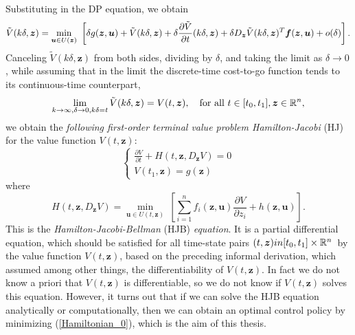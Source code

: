 Substituting in the DP equation, we obtain
\begin{equation}
\tilde{V}(k\delta,\bm{z})=\min_{\bm{u}\in U(\bm{z})}\ \left[\delta g(\bm{z},\bm{u})+\tilde{V}(k\delta,\bm{z})+\delta\frac{\partial\tilde{V}}{\partial t}(k\delta,\bm{z})\\
+\delta D_{\bm{z}}\tilde{V}(k\delta,\bm{z})^T\bm{f}(\bm{z},\bm{u})+o(\delta)\right].
\end{equation}
Canceling $\tilde{V}(k\delta,\bm{z})$ from both sides, dividing by $\delta$, and 
taking the limit as $\delta\to0$, while assuming that in the limit the discrete-time
 cost-to-go function tends to  its continuous-time counterpart,
\begin{equation*}
\lim_{k\to\infty,\delta\to0,k\delta=t}\tilde{V}(k\delta,\bm{z})=V(t,\bm{z}),\quad\text{for all}\ t\in[t_0,t_1],\bm{z}\in\mathbb{R}^n,
\end{equation*}
we obtain the \textit{following first-order terminal value problem Hamilton-Jacobi} (HJ) for the value function $V(t,\bm{z})$:
\begin{equation}
\begin{cases}
\frac{\partial V}{\partial t}+H(t,\bm{z},D_{\bm{z}}V)=0\\
V(t_1,\bm{z})=g(\bm{z})
\end{cases}
\label{The_HJB_1}
\end{equation}
where
\begin{equation}
H(t,\bm{z},D_{\bm{z}}V)=\min_{\bm{u}\in U(t,\bm{z})}\ \left[\sum_{i=1}^nf_i(\bm{z},\bm{u})\frac{\partial V}{\partial z_i}+h(\bm{z},\bm{u})\right].
\label{Hamiltonian_0}
\end{equation}
This is the \textit{Hamilton-Jacobi-Bellman} (HJB) \textit{equation}. It is a 
partial differential equation, which should be satisfied for all time-state 
pairs $(t,\bm{z})in[t_0,t_1]\times\mathbb{R}^n$\ by the value function $V(t,\bm{z})$, 
based on the preceding informal derivation, which assumed among other things, 
the differentiability of $V(t,\bm{z})$. In fact we do not know a priori that 
$V(t,\bm{z})$ is differentiable, so we do not know if $V(t,\bm{z})$ solves 
this equation. However, it turns out that if we can solve the HJB equation 
analytically or computationally, then we can obtain an optimal control 
policy by minimizing (\ref{Hamiltonian_0}), which is the aim of this thesis.


